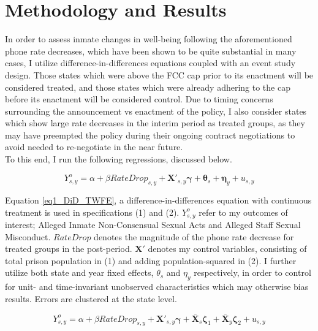 \documentclass[12pt,a4paper]{article}
\begin{document}
\section{Methodology and Results}
In order to assess inmate changes in well-being following the aforementioned phone rate decreases, which have been shown to be quite substantial in many cases, I utilize difference-in-differences equations coupled with an event study design. Those states which were above the FCC cap prior to its enactment will be considered treated, and those states which were already adhering to the cap before its enactment will be considered control. Due to timing concerns surrounding the announcement vs enactment of the policy, I also consider states which show large rate decreases in the interim period as treated groups, as they may have preempted the policy during their ongoing contract negotiations to avoid needed to re-negotiate in the near future. \\

To this end, I run the following regressions, discussed below. 

\begin{equation}
	Y^{o}_{s,y} = \alpha + \beta RateDrop_{s,y} + \boldsymbol{X'}_{s,y} \boldsymbol{\gamma} + \boldsymbol{\theta}_{s} + \boldsymbol{\eta}_{y} + u_{s,y}
	\label{eq1_DiD_TWFE}
\end{equation}

Equation \ref{eq1_DiD_TWFE}, a difference-in-differences equation with continuous treatment is used in specifications (1) and (2). $Y^{o}_{s,y}$ refer to my outcomes of interest; Alleged Inmate Non-Consensual Sexual Acts and Alleged Staff Sexual Misconduct. $RateDrop$ denotes the magnitude of the phone rate decrease for treated groups in the post-period. $\boldsymbol{X'}$ denotes my control variables, consisting of total prison population in (1) and adding population-squared in (2). I further utilize both state and year fixed effects, $\theta_{s}$ and $\eta_{y}$ respectively, in order to control for unit- and time-invariant unobserved characteristics which may otherwise bias results. Errors are clustered at the state level. 

\begin{equation}
	Y^{o}_{s,y} = \alpha + \beta RateDrop_{s,y} + \boldsymbol{X'}_{s,y} \boldsymbol{\gamma} + \boldsymbol{\bar{X}}_{s} \boldsymbol{\zeta}_1 + \boldsymbol{\bar{X}}_{y} \boldsymbol{\zeta}_2 + u_{s,y}
	\label{eq2_DiD_TWM}
\end{equation}
\end{document}
